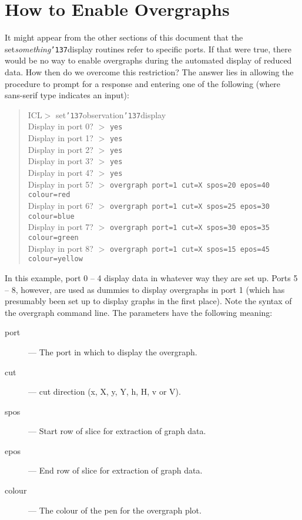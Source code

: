 \documentclass[a4paper]{book}
\renewcommand{\_}{{\tt\char'137}}
\begin{document}
\section{How to Enable Overgraphs}
It might appear from the other sections of this document that the
set{\em something}\_display routines refer to specific ports. If that were true,
there would be no way to enable overgraphs during the automated display
of reduced data. How then do we overcome this restriction? The answer lies
in allowing the procedure to prompt for a response and entering one of
the following (where sans-serif type indicates an input):
\begin{quote}
ICL$>$ set\_observation\_display \\
Display in port 0?  $>$ {\tt yes} \\
Display in port 1?  $>$ {\tt yes} \\
Display in port 2?  $>$ {\tt yes} \\
Display in port 3?  $>$ {\tt yes} \\
Display in port 4?  $>$ {\tt yes} \\
Display in port 5?  $>$ {\tt overgraph port=1 cut=X spos=20 epos=40 colour=red} \\
Display in port 6?  $>$ {\tt overgraph port=1 cut=X spos=25 epos=30 colour=blue} \\
Display in port 7?  $>$ {\tt overgraph port=1 cut=X spos=30 epos=35 colour=green} \\
Display in port 8?  $>$ {\tt overgraph port=1 cut=X spos=15 epos=45 colour=yellow}
\end{quote}

In this example, port 0 -- 4 display data in whatever way they are set
up. Ports 5 -- 8, however, are used as dummies to display overgraphs in
port 1 (which has presumably been set up to display graphs in the first
place). Note the syntax of the overgraph command line. The parameters
have the following meaning:

\begin{description}
\item[{\sc port}]--- The port in which to display the overgraph.
\item[{\sc cut}]--- cut direction (x, X, y, Y, h, H, v or V).
\item[{\sc spos}]--- Start row of slice for extraction of graph data.
\item[{\sc epos}]--- End row of slice for extraction of graph data.
\item[{\sc colour}]--- The colour of the pen for the overgraph plot.
\end{description}
\end{document}
